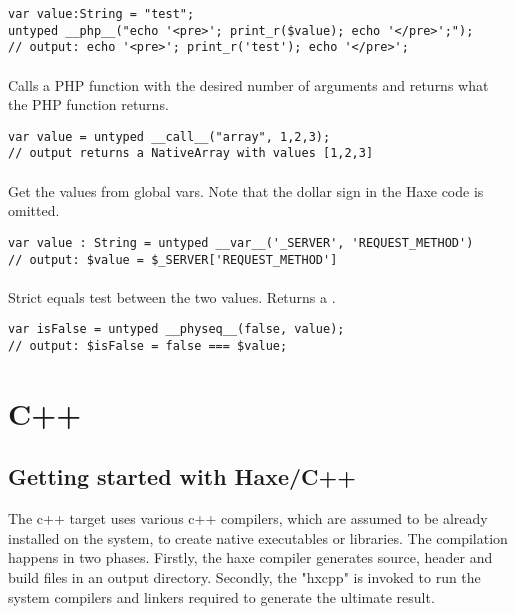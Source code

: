 \begin{lstlisting}
var value:String = "test";
untyped __php__("echo '<pre>'; print_r($value); echo '</pre>';");
// output: echo '<pre>'; print_r('test'); echo '</pre>';
\end{lstlisting}

\paragraph{}
Calls a PHP function with the desired number of arguments and returns what the PHP function returns.

\begin{lstlisting}
var value = untyped __call__("array", 1,2,3); 
// output returns a NativeArray with values [1,2,3]
\end{lstlisting}

\paragraph{}
Get the values from global vars. Note that the dollar sign in the Haxe code is omitted.

\begin{lstlisting}
var value : String = untyped __var__('_SERVER', 'REQUEST_METHOD')  
// output: $value = $_SERVER['REQUEST_METHOD']
\end{lstlisting}

\paragraph{}
Strict equals test between the two values. Returns a .

\begin{lstlisting}
var isFalse = untyped __physeq__(false, value);
// output: $isFalse = false === $value;
\end{lstlisting}


\section{C++}
\label{target-cpp}

\subsection{Getting started with Haxe/C++}
\label{target-cpp-getting-started}
The c++ target uses various c++ compilers, which are assumed to be already installed on the system, to create native executables or libraries.  The compilation happens in two phases.  Firstly, the haxe compiler generates source, header and build files in an output directory.  Secondly, the "hxcpp"  is invoked to run the system compilers and linkers required to generate the ultimate result.

